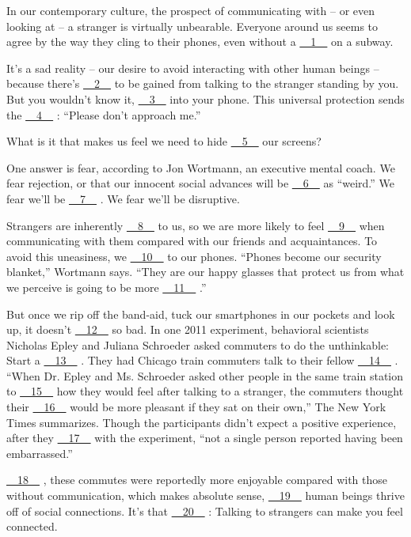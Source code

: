 In our contemporary culture, the prospect of communicating with – or even looking at – a stranger is virtually unbearable. Everyone around us seems to agree by the way they cling to their phones, even without a \uline{~~1~~} on a subway.


It's a sad reality – our desire to avoid interacting with other human beings – because there's \uline{~~2~~} to be gained from talking to the stranger standing by you. But you wouldn't know it, \uline{~~3~~} into your phone. This universal protection sends the \uline{~~4~~} : ``Please don't approach me.''


What is it that makes us feel we need to hide \uline{~~5~~} our screens?


One answer is fear, according to Jon Wortmann, an executive mental coach. We fear rejection, or that our innocent social advances will be \uline{~~6~~} as ``weird.'' We fear we'll be \uline{~~7~~} . We fear we'll be disruptive.


Strangers are inherently \uline{~~8~~} to us, so we are more likely to feel \uline{~~9~~} when communicating with them compared with our friends and acquaintances. To avoid this uneasiness, we \uline{~~10~~} to our phones. ``Phones become our security blanket,'' Wortmann says. ``They are our happy glasses that protect us from what we perceive is going to be more \uline{~~11~~} .''


But once we rip off the band-aid, tuck our smartphones in our pockets and look up, it doesn't \uline{~~12~~} so bad. In one 2011 experiment, behavioral scientists Nicholas Epley and Juliana Schroeder asked commuters to do the unthinkable: Start a \uline{~~13~~} . They had Chicago train commuters talk to their fellow \uline{~~14~~} . ``When Dr. Epley and Ms. Schroeder asked other people in the same train station to \uline{~~15~~} how they would feel after talking to a stranger, the commuters thought their \uline{~~16~~} would be more pleasant if they sat on their own,'' The New York Times summarizes. Though the participants didn't expect a positive experience, after they \uline{~~17~~} with the experiment, ``not a single person reported having been embarrassed.''


\uline{~~18~~} , these commutes were reportedly more enjoyable compared with those without communication, which makes absolute sense, \uline{~~19~~} human beings thrive off of social connections. It's that \uline{~~20~~} : Talking to strangers can make you feel connected.